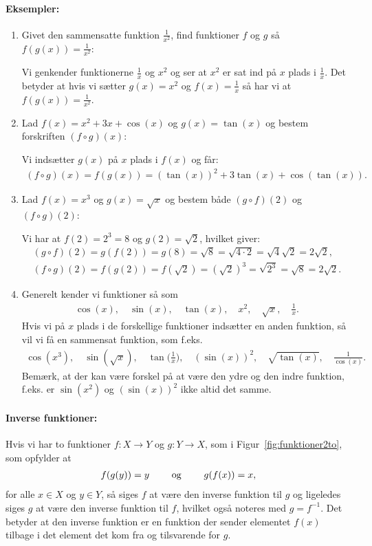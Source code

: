 \paragraph*{Eksempler:}
\begin{enumerate}
\item Givet den sammensatte funktion $\frac{1}{x^2}$, find funktioner $f$ og $g$ så $f(g(x))=\frac{1}{x^2}$:

Vi genkender funktionerne $\frac{1}{x}$ og $x^2$ og ser at $x^2$ er sat ind på $x$ plads i $\frac{1}{x}$. Det betyder at hvis vi sætter $g(x)=x^2$ og $f(x)=\frac{1}{x}$ så har vi at $f(g(x))=\frac{1}{x^2}$.
\item Lad $f(x) = x^2+3x + \cos(x)$ og $g(x) = \tan(x)$ og bestem forskriften $(f \circ g)(x)$:

Vi indsætter $g(x)$ på $x$ plads i $f(x)$ og får:
\begin{align*}
(f \circ g)(x) = f(g(x))= (\tan (x))^2 + 3\tan(x) + \cos(\tan(x)).
\end{align*} 
\item Lad $f (x) = x^3$ og $g(x) = \sqrt{x}$ og bestem både $(g \circ f)(2)$ og $(f \circ g)(2)$:

Vi har at $f(2)=2^3 = 8$ og $g(2)=\sqrt{2}$, hvilket giver:
\begin{align*}
(g \circ f) (2) = g(f(2)) = g(8)=\sqrt{8}=\sqrt{4 \cdot 2} = \sqrt{4}\sqrt{2} = 2\sqrt{2}, \\
(f \circ g)(2) = f(g(2)) = f(\sqrt{2}) = (\sqrt{2})^3 = \sqrt{2^3} = \sqrt{8} = 2\sqrt{2}.
\end{align*}
\item Generelt kender vi funktioner så som 
\begin{align*}
\cos (x), \quad \sin (x),\quad \tan (x),\quad  x^2,\quad  \sqrt{x},\quad  \frac{1}{x}.
\end{align*} 
Hvis vi på $x$ plads i de forskellige funktioner indsætter en anden funktion, så vil vi få en sammensat funktion, som f.eks.
\begin{align*}
\cos(x^3), \quad  \sin (\sqrt{x}), \quad  \tan \Big( \frac{1}{x} \Big),\quad  (\sin(x))^2, \quad  \sqrt{\tan(x)}, \quad  \frac{1}{\cos(x)}.
\end{align*}
Bemærk, at der kan være forskel på at være den ydre og den indre funktion, f.eks. er $\sin (x^2)$ og $(\sin (x))^2$ ikke altid det samme.
\end{enumerate}
\paragraph*{Inverse funktioner:}
Hvis vi har to funktioner $f \colon X \to Y$ og $g \colon Y \to X$, som i Figur~\ref{fig:funktioner2to}, som opfylder at 
\begin{align*}
f(g(y))=y \qquad \textup{ og } \qquad g(f(x))=x,
\end{align*}
for alle $x \in X$ og $y \in Y$, så siges $f$ at være den inverse funktion til $g$ og ligeledes siges $g$ at være den inverse funktion til $f$, hvilket også noteres med $g=f^{-1}$. Det betyder at den inverse funktion er en funktion der sender elementet $f(x)$ tilbage i det element det kom fra og tilsvarende for $g$. 

